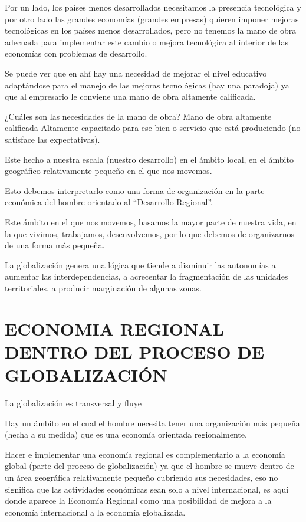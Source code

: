 \documentclass[
  a4paper,
]{article}
\begin{document}
Por un lado, los países menos desarrollados necesitamos la presencia
tecnológica y por otro lado las grandes economías (grandes empresas)
quieren imponer mejoras tecnológicas en los países menos desarrollados,
pero no tenemos la mano de obra adecuada para implementar este cambio o
mejora tecnológica al interior de las economías con problemas de
desarrollo.

Se puede ver que en ahí hay una necesidad de mejorar el nivel educativo
adaptándose para el manejo de las mejoras tecnológicas (hay una
paradoja) ya que al empresario le conviene una mano de obra altamente
calificada.

¿Cuáles son las necesidades de la mano de obra? Mano de obra altamente
calificada Altamente capacitado para ese bien o servicio que está
produciendo (no satisface las expectativas).

Este hecho a nuestra escala (nuestro desarrollo) en el ámbito local, en
el ámbito geográfico relativamente pequeño en el que nos movemos.

Esto debemos interpretarlo como una forma de organización en la parte
económica del hombre orientado al ``Desarrollo Regional''.

Este ámbito en el que nos movemos, basamos la mayor parte de nuestra
vida, en la que vivimos, trabajamos, desenvolvemos, por lo que debemos
de organizarnos de una forma más pequeña.

La globalización genera una lógica que tiende a disminuir las autonomías
a aumentar las interdependencias, a acrecentar la fragmentación de las
unidades territoriales, a producir marginación de algunas zonas.

\hypertarget{economia-regional-dentro-del-proceso-de-globalizaciuxf3n}{%
\section{ECONOMIA REGIONAL DENTRO DEL PROCESO DE
GLOBALIZACIÓN}\label{economia-regional-dentro-del-proceso-de-globalizaciuxf3n}}

La globalización es transversal y fluye

Hay un ámbito en el cual el hombre necesita tener una organización más
pequeña (hecha a su medida) que es una economía orientada regionalmente.

Hacer e implementar una economía regional es complementario a la
economía global (parte del proceso de globalización) ya que el hombre se
mueve dentro de un área geográfica relativamente pequeño cubriendo sus
necesidades, eso no significa que las actividades económicas sean solo a
nivel internacional, es aquí donde aparece la Economía Regional como una
posibilidad de mejora a la economía internacional a la economía
globalizada.
\end{document}
